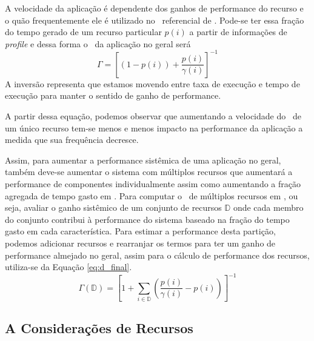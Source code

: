       A velocidade da aplicação é dependente dos ganhos de performance do recurso e o quão frequentemente ele é utilizado no \design\ referencial de \software.
      Pode-se ter essa fração do tempo gerado de um recurso particular $ p(i) $ a partir de informações de \textit{profile} e dessa forma o \speedup\ da aplicação no geral será
      \begin{equation}
         \Gamma = \left [
         (1 - p(i))
         +
         \frac{
            p(i)
         }{
            \gamma(i)
         } \right ]^{-1}
      \end{equation}
      A inversão representa que estamos movendo entre taxa de execução e tempo de execução para manter o sentido de ganho de performance.

      A partir dessa equação, podemos observar que aumentando a velocidade do \hardware\ de um único recurso tem-se menos e menos impacto na performance da aplicação a medida que sua frequência decresce.

      Assim, para aumentar a performance sistêmica de uma aplicação no geral, também deve-se aumentar o sistema com múltiplos recursos que aumentará a performance de componentes individualmente assim como aumentando a fração agregada de tempo gasto em \hardware.
      Para computar o \speedup\ de múltiplos recursos em \hardware, ou seja, avaliar o ganho sistêmico de um conjunto de recursos $ \mathbb{D} $ onde cada membro do conjunto contribui à performance do sistema baseado na fração do tempo gasto em cada característica.
      Para estimar a performance desta partição, podemos adicionar recursos e rearranjar os termos para ter um ganho de performance almejado no geral, assim para o cálculo de performance dos recursos, utiliza-se da Equação \ref{eq:d_final}.
      \begin{equation}
         \Gamma (\mathbb{D}) =
         \left [
         1 + \sum _{i \in \mathbb{D}} \left (
         \frac{
            p(i)
         }{
            \gamma(i)
         }-p(i)
         \right)
         \right ]^{-1} \label{eq:d_final}
      \end{equation}

      \subsection{A Considerações de Recursos} \label{sec:recursos}

